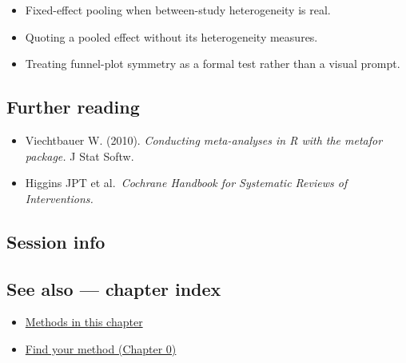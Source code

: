 \documentclass[
]{article}
\newenvironment{Shaded}{\begin{snugshade}}{\end{snugshade}}
\providecommand{\tightlist}{%
  \setlength{\itemsep}{0pt}\setlength{\parskip}{0pt}}
\begin{document}
\begin{itemize}
\tightlist
\item
  Fixed-effect pooling when between-study heterogeneity is real.
\item
  Quoting a pooled effect without its heterogeneity measures.
\item
  Treating funnel-plot symmetry as a formal test rather than a visual
  prompt.
\end{itemize}

\subsection{Further reading}\label{further-reading}

\begin{itemize}
\tightlist
\item
  Viechtbauer W. (2010). \emph{Conducting meta-analyses in R with the
  metafor package.} J Stat Softw.
\item
  Higgins JPT et al.~\emph{Cochrane Handbook for Systematic Reviews of
  Interventions.}
\end{itemize}

\subsection{Session info}\label{session-info}

\begin{Shaded}
\begin{Highlighting}[]

\end{Highlighting}
\end{Shaded}

\subsection{See also --- chapter index}\label{see-also-chapter-index}

\begin{itemize}
\tightlist
\item
  \href{../index.Rmd}{Methods in this chapter}
\item
  \href{../../../ch00-find-your-method.Rmd}{Find your method (Chapter
  0)}
\end{itemize}
\end{document}
